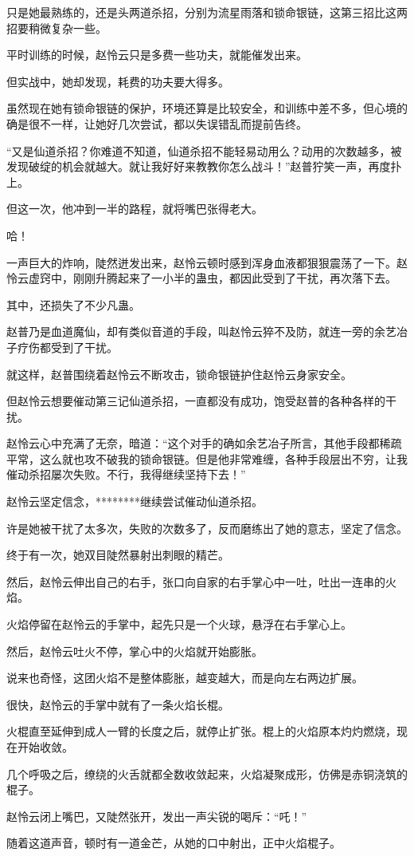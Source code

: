 \begin{this_body}
只是她最熟练的，还是头两道杀招，分别为流星雨落和锁命银链，这第三招比这两招要稍微复杂一些。

平时训练的时候，赵怜云只是多费一些功夫，就能催发出来。

但实战中，她却发现，耗费的功夫要大得多。

虽然现在她有锁命银链的保护，环境还算是比较安全，和训练中差不多，但心境的确是很不一样，让她好几次尝试，都以失误错乱而提前告终。

“又是仙道杀招？你难道不知道，仙道杀招不能轻易动用么？动用的次数越多，被发现破绽的机会就越大。就让我好好来教教你怎么战斗！”赵普狞笑一声，再度扑上。

但这一次，他冲到一半的路程，就将嘴巴张得老大。

哈！

一声巨大的炸响，陡然迸发出来，赵怜云顿时感到浑身血液都狠狠震荡了一下。赵怜云虚窍中，刚刚升腾起来了一小半的蛊虫，都因此受到了干扰，再次落下去。

其中，还损失了不少凡蛊。

赵普乃是血道魔仙，却有类似音道的手段，叫赵怜云猝不及防，就连一旁的余艺冶子疗伤都受到了干扰。

就这样，赵普围绕着赵怜云不断攻击，锁命银链护住赵怜云身家安全。

但赵怜云想要催动第三记仙道杀招，一直都没有成功，饱受赵普的各种各样的干扰。

赵怜云心中充满了无奈，暗道：“这个对手的确如余艺冶子所言，其他手段都稀疏平常，这么就也攻不破我的锁命银链。但是他非常难缠，各种手段层出不穷，让我催动杀招屡次失败。不行，我得继续坚持下去！”

赵怜云坚定信念，********继续尝试催动仙道杀招。

许是她被干扰了太多次，失败的次数多了，反而磨练出了她的意志，坚定了信念。

终于有一次，她双目陡然暴射出刺眼的精芒。

然后，赵怜云伸出自己的右手，张口向自家的右手掌心中一吐，吐出一连串的火焰。

火焰停留在赵怜云的手掌中，起先只是一个火球，悬浮在右手掌心上。

然后，赵怜云吐火不停，掌心中的火焰就开始膨胀。

说来也奇怪，这团火焰不是整体膨胀，越变越大，而是向左右两边扩展。

很快，赵怜云的手掌中就有了一条火焰长棍。

火棍直至延伸到成人一臂的长度之后，就停止扩张。棍上的火焰原本灼灼燃烧，现在开始收敛。

几个呼吸之后，缭绕的火舌就都全数收敛起来，火焰凝聚成形，仿佛是赤铜浇筑的棍子。

赵怜云闭上嘴巴，又陡然张开，发出一声尖锐的喝斥：“吒！”

随着这道声音，顿时有一道金芒，从她的口中射出，正中火焰棍子。

\end{this_body}

